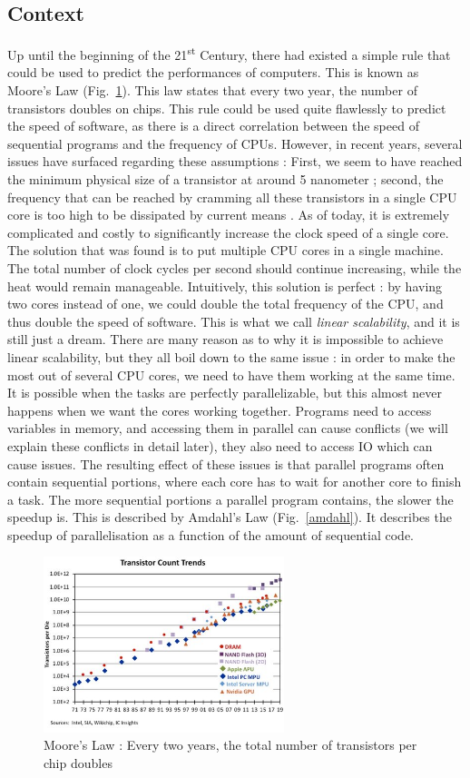 \documentclass[conference]{IEEEtran}
\begin{document}
\subsection{Context}
Up until the beginning of the 21\textsuperscript{st} Century, there had existed a simple rule that could be used to predict the performances of computers. This is known as Moore's Law (Fig.~\ref{moore}). This law states that every two year, the number of transistors doubles on chips. This rule could be used quite flawlessly to predict the speed of software, as there is a direct correlation between the speed of sequential programs and the frequency of CPUs. However, in recent years, several issues have surfaced regarding these assumptions : First, we seem to have reached the minimum physical size of a transistor at around 5 nanometer ; second, the frequency that can be reached by cramming all these transistors in a single CPU core is too high to be dissipated by current means \cite{moore}. As of today, it is extremely complicated and costly to significantly increase the clock speed of a single core. The solution that was found is to put multiple CPU cores in a single machine. The total number of clock cycles per second should continue increasing, while the heat would remain manageable. Intuitively, this solution is perfect : by having two cores instead of one, we could double the total frequency of the CPU, and thus double the speed of software. This is what we call \textit{linear scalability}, and it is still just a dream. There are many reason as to why it is impossible to achieve linear scalability, but they all boil down to the same issue : in order to make the most out of several CPU cores, we need to have them working at the same time. It is possible when the tasks are perfectly parallelizable, but this almost never happens when we want the cores working together. Programs need to access variables in memory, and accessing them in parallel can cause conflicts (we will explain these conflicts in detail later), they also need to access IO which can cause issues. The resulting effect of these issues is that parallel programs often contain sequential portions, where each core has to wait for another core to finish a task. The more sequential portions a parallel program contains, the slower the speedup is. This is described by Amdahl's Law \cite{amdahl} (Fig.~\ref{amdahl}). It describes the speedup of parallelisation as a function of the amount of sequential code.

\begin{figure}[!ht]
\centerline{\includegraphics[width=70mm]{moore.jpg}}
\caption{Moore's Law : Every two years, the total number of transistors per chip doubles}\label{moore}
\end{figure}
\end{document}
